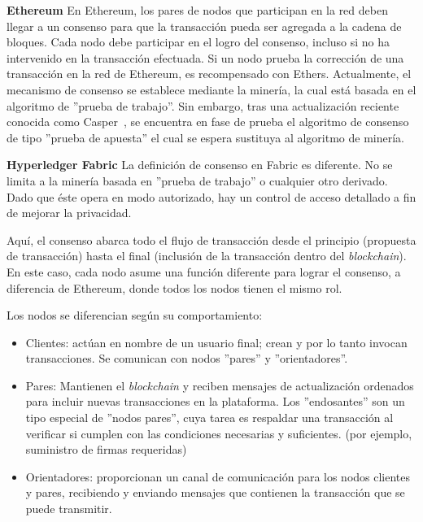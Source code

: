 \noindent
\textbf{Ethereum} \newline
En Ethereum, los pares de nodos que participan en la red deben llegar a un consenso para que la transacción pueda ser agregada a la cadena de bloques. Cada nodo debe participar en el logro del consenso, incluso si no ha intervenido en la transacción efectuada. Si un nodo prueba la corrección de una transacción en la red de Ethereum, es recompensado con Ethers. Actualmente, el mecanismo de consenso se establece mediante la minería, la cual está basada en el algoritmo de ''prueba de trabajo''. Sin embargo, tras una actualización reciente conocida como Casper~\cite{buterin2017casper}, se encuentra en fase de prueba el algoritmo de consenso de tipo ''prueba de apuesta'' el  cual se espera sustituya al algoritmo de minería.

\noindent
\textbf{Hyperledger Fabric} \newline 
La definición de consenso en Fabric es diferente. No se limita a la minería basada en ''prueba de trabajo'' o cualquier otro derivado. Dado que éste opera en modo autorizado, hay un control de acceso detallado a fin de mejorar la privacidad.

Aquí, el consenso abarca todo el flujo de transacción desde el principio (propuesta de transacción) hasta el final (inclusión de la transacción dentro del \textit{blockchain}). En este caso, cada nodo asume una función diferente para lograr el consenso, a diferencia de Ethereum, donde todos los nodos tienen el mismo rol.

Los nodos se diferencian según su comportamiento:
\begin{itemize}
    \item Clientes: actúan en nombre de un usuario final; crean y por lo tanto invocan transacciones. Se comunican con  nodos ''pares'' y ''orientadores''.
    \item Pares: Mantienen el \textit{blockchain} y reciben mensajes de actualización ordenados para incluir nuevas transacciones en la plataforma. Los ''endosantes'' son un tipo especial de ''nodos pares'', cuya tarea es respaldar una transacción al verificar si cumplen con las condiciones necesarias y suficientes. (por ejemplo, suministro de firmas requeridas)
    \item Orientadores: proporcionan un canal de comunicación para los nodos clientes y pares, recibiendo y enviando mensajes que contienen la transacción que se puede transmitir.
\end{itemize}

